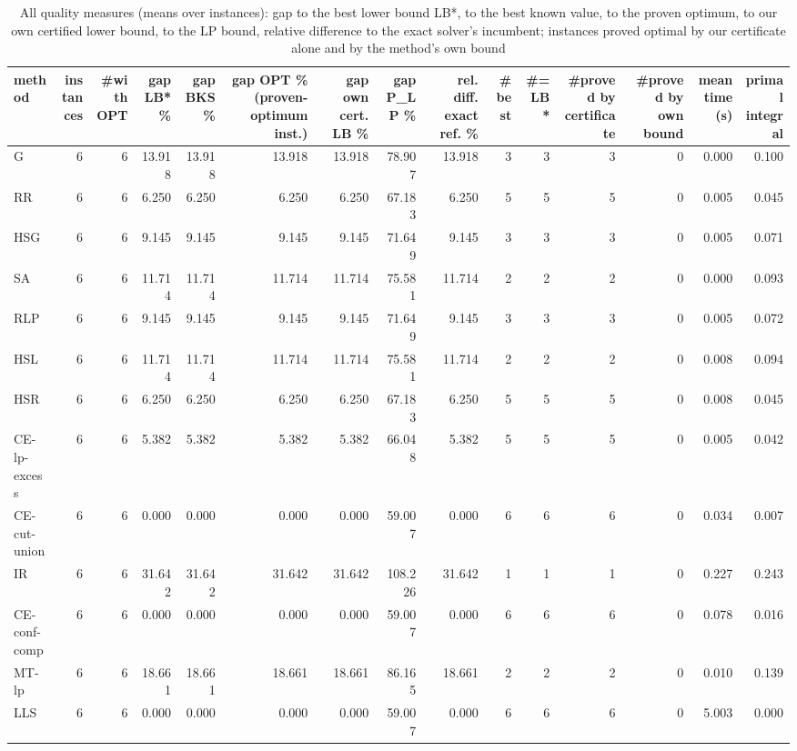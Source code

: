 \begin{table}[htbp]
\centering
\small
\caption{All quality measures (means over instances): gap to the best lower bound LB*, to the best known value, to the proven optimum, to our own certified lower bound, to the LP bound, relative difference to the exact solver's incumbent; instances proved optimal by our certificate alone and by the method's own bound}
\label{tab:E0_sanity_b5_all_metrics}
\begin{tabular}{lrrrrrrrrrrrrrr}
\toprule
method & instances & \#with OPT & gap LB* \% & gap BKS \% & gap OPT \% (proven-optimum inst.) & gap own cert. LB \% & gap P\_LP \% & rel. diff. exact ref. \% & \#best & \#= LB* & \#proved by certificate & \#proved by own bound & mean time (s) & primal integral \\
\midrule
G & 6 & 6 & 13.918 & 13.918 & 13.918 & 13.918 & 78.907 & 13.918 & 3 & 3 & 3 & 0 & 0.000 & 0.100 \\
RR & 6 & 6 & 6.250 & 6.250 & 6.250 & 6.250 & 67.183 & 6.250 & 5 & 5 & 5 & 0 & 0.005 & 0.045 \\
HSG & 6 & 6 & 9.145 & 9.145 & 9.145 & 9.145 & 71.649 & 9.145 & 3 & 3 & 3 & 0 & 0.005 & 0.071 \\
SA & 6 & 6 & 11.714 & 11.714 & 11.714 & 11.714 & 75.581 & 11.714 & 2 & 2 & 2 & 0 & 0.000 & 0.093 \\
RLP & 6 & 6 & 9.145 & 9.145 & 9.145 & 9.145 & 71.649 & 9.145 & 3 & 3 & 3 & 0 & 0.005 & 0.072 \\
HSL & 6 & 6 & 11.714 & 11.714 & 11.714 & 11.714 & 75.581 & 11.714 & 2 & 2 & 2 & 0 & 0.008 & 0.094 \\
HSR & 6 & 6 & 6.250 & 6.250 & 6.250 & 6.250 & 67.183 & 6.250 & 5 & 5 & 5 & 0 & 0.008 & 0.045 \\
CE-lp-excess & 6 & 6 & 5.382 & 5.382 & 5.382 & 5.382 & 66.048 & 5.382 & 5 & 5 & 5 & 0 & 0.005 & 0.042 \\
CE-cut-union & 6 & 6 & 0.000 & 0.000 & 0.000 & 0.000 & 59.007 & 0.000 & 6 & 6 & 6 & 0 & 0.034 & 0.007 \\
IR & 6 & 6 & 31.642 & 31.642 & 31.642 & 31.642 & 108.226 & 31.642 & 1 & 1 & 1 & 0 & 0.227 & 0.243 \\
CE-conf-comp & 6 & 6 & 0.000 & 0.000 & 0.000 & 0.000 & 59.007 & 0.000 & 6 & 6 & 6 & 0 & 0.078 & 0.016 \\
MT-lp & 6 & 6 & 18.661 & 18.661 & 18.661 & 18.661 & 86.165 & 18.661 & 2 & 2 & 2 & 0 & 0.010 & 0.139 \\
LLS & 6 & 6 & 0.000 & 0.000 & 0.000 & 0.000 & 59.007 & 0.000 & 6 & 6 & 6 & 0 & 5.003 & 0.000 \\

\end{tabular}
\end{table}
